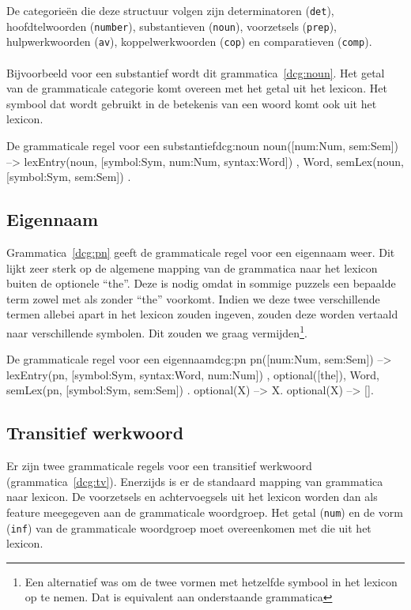 De categorieën die deze structuur volgen zijn determinatoren (\texttt{det}), hoofdtelwoorden (\texttt{number}), substantieven (\texttt{noun}), voorzetsels (\texttt{prep}), hulpwerkwoorden (\texttt{av}), koppelwerkwoorden (\texttt{cop}) en comparatieven (\texttt{comp}).

\paragraph{}Bijvoorbeeld voor een substantief wordt dit grammatica~\ref{dcg:noun}. Het getal van de grammaticale categorie komt overeen met het getal uit het lexicon. Het symbool dat wordt gebruikt in de betekenis van een woord komt ook uit het lexicon.
\begin{dcg}{De grammaticale regel voor een substantief}{dcg:noun}
noun([num:Num, sem:Sem]) -->
  { lexEntry(noun, [symbol:Sym, num:Num, syntax:Word]) },
  Word,
  { semLex(noun, [symbol:Sym, sem:Sem]) }.
\end{dcg}

\subsection{Eigennaam}
Grammatica~\ref{dcg:pn} geeft de grammaticale regel voor een eigennaam weer. Dit lijkt zeer sterk op de algemene mapping van de grammatica naar het lexicon buiten de optionele ``the''. Deze is nodig omdat in sommige puzzels een bepaalde term zowel met als zonder ``the'' voorkomt. Indien we deze twee verschillende termen allebei apart in het lexicon zouden ingeven, zouden deze worden vertaald naar verschillende symbolen. Dit zouden we graag vermijden\footnote{Een alternatief was om de twee vormen met hetzelfde symbool in het lexicon op te nemen. Dat is equivalent aan onderstaande grammatica}.

\begin{dcg}{De grammaticale regel voor een eigennaam}{dcg:pn}
pn([num:Num, sem:Sem]) -->
  { lexEntry(pn, [symbol:Sym, syntax:Word, num:Num]) },
  optional([the]),
  Word,
  { semLex(pn, [symbol:Sym, sem:Sem]) }.
optional(X) -->
  X.
optional(X) -->
  [].
\end{dcg}

\subsection{Transitief werkwoord}
\label{sec:gramm-tv}
Er zijn twee grammaticale regels voor een transitief werkwoord (grammatica~\ref{dcg:tv}). Enerzijds is er de standaard mapping van grammatica naar lexicon. De voorzetsels en achtervoegsels uit het lexicon worden dan als feature meegegeven aan de grammaticale woordgroep. Het getal (\texttt{num}) en de vorm (\texttt{inf}) van de grammaticale woordgroep moet overeenkomen met die uit het lexicon.

